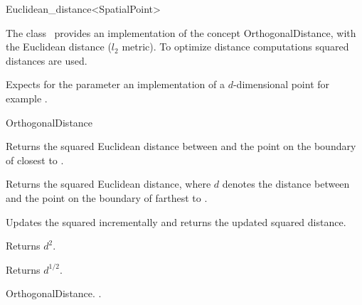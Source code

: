 

\begin{ccRefClass}{Euclidean_distance<SpatialPoint>}  %


\ccDefinition
  
The class \ccRefName\ provides an implementation of the concept OrthogonalDistance, with the
Euclidean distance ($l_2$ metric).
To optimize distance computations squared distances are used.



\ccParameters

Expects for the parameter
 an implementation
of a $d$-dimensional point
for example .

\ccIsModel

OrthogonalDistance

\ccTypes


\ccCreation
{}  %


\ccOperations
 

{Returns the squared Euclidean distance between  and
the point on the boundary of  closest to .}

{Returns the squared Euclidean distance, where $d$ denotes the distance between  and
the point on the boundary of  farthest to .}

 {Updates the squared  incrementally
and returns the updated squared distance.}

 {Returns $d^2$.}

 {Returns $d^{1/2}$.}

\ccSeeAlso

OrthogonalDistance.
.
\end{ccRefClass}


